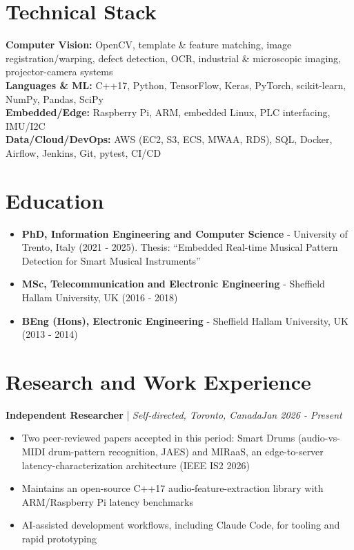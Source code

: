 \documentclass[11pt]{article}
\newenvironment{cvrole}[5]{%
  \par\noindent\textbf{\large #1} | \textit{\small #2, #3}\hfill \textit{\small #4 - #5}\par
  \begin{itemize}[leftmargin=2em, itemsep=-0.3em, topsep=-0.5em]%
}{%
  \end{itemize}\par\noindent\mbox{}\par\vspace{0.1em}%
}
\begin{document}
\section*{Technical Stack}
\textbf{Computer Vision:} OpenCV, template \& feature matching, image registration/warping, defect detection, OCR, industrial \& microscopic imaging, projector-camera systems \\
\textbf{Languages \& ML:} C++17, Python, TensorFlow, Keras, PyTorch, scikit-learn, NumPy, Pandas, SciPy \\
\textbf{Embedded/Edge:} Raspberry Pi, ARM, embedded Linux, PLC interfacing, IMU/I2C \\
\textbf{Data/Cloud/DevOps:} AWS (EC2, S3, ECS, MWAA, RDS), SQL, Docker, Airflow, Jenkins, Git, pytest, CI/CD

\section*{Education}
\begin{itemize}[leftmargin=2em, itemsep=-0.2em, topsep=0.1em]
    \item \textbf{PhD, Information Engineering and Computer Science} - University of Trento, Italy (2021 - 2025). Thesis: ``Embedded Real-time Musical Pattern Detection for Smart Musical Instruments''
    \item \textbf{MSc, Telecommunication and Electronic Engineering} - Sheffield Hallam University, UK (2016 - 2018)
    \item \textbf{BEng (Hons), Electronic Engineering} - Sheffield Hallam University, UK (2013 - 2014)
\end{itemize}

\section*{Research and Work Experience}

\begin{cvrole}{Independent Researcher}{Self-directed}{Toronto, Canada}{Jan 2026}{Present}
    \item Two peer-reviewed papers accepted in this period: Smart Drums (audio-vs-MIDI drum-pattern recognition, JAES) and MIRaaS, an edge-to-server latency-characterization architecture (IEEE IS2 2026)
    \item Maintains an open-source C++17 audio-feature-extraction library with ARM/Raspberry Pi latency benchmarks
    \item AI-assisted development workflows, including Claude Code, for tooling and rapid prototyping
\end{cvrole}
\end{document}

